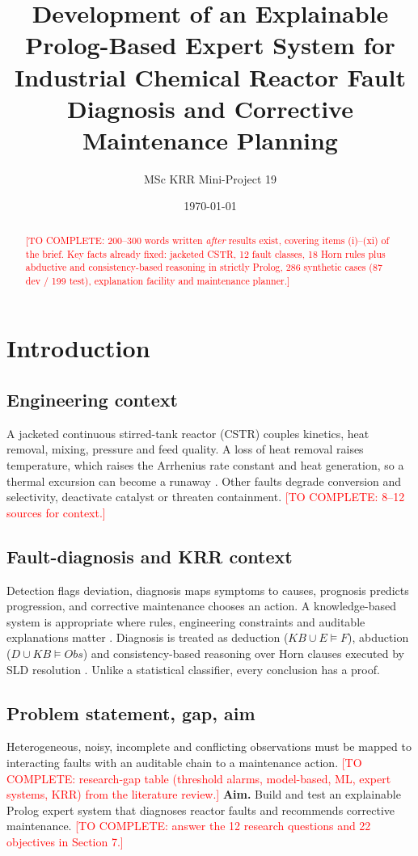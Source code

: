 \documentclass[11pt,a4paper]{article}
\title{Development of an Explainable Prolog-Based Expert System for Industrial Chemical Reactor Fault Diagnosis and Corrective Maintenance Planning}
\author{MSc KRR Mini-Project 19}
\date{\today}
\newcommand{\TODO}[1]{\textcolor{red}{[TO COMPLETE: #1]}}
\begin{document}
\maketitle
\begin{abstract}\TODO{200--300 words written \emph{after} results exist, covering items (i)--(xi) of the brief. Key facts already fixed: jacketed CSTR, 12 fault classes, 18 Horn rules plus abductive and consistency-based reasoning in strictly Prolog, 286 synthetic cases (87 dev / 199 test), explanation facility and maintenance planner.}\end{abstract}
\tableofcontents

\section{Introduction}
\subsection{Engineering context}
A jacketed continuous stirred-tank reactor (CSTR) couples kinetics, heat removal, mixing, pressure and feed quality. A loss of heat removal raises temperature, which raises the Arrhenius rate constant and heat generation, so a thermal excursion can become a runaway \cite{stoessel2008,fogler2016}. Other faults degrade conversion and selectivity, deactivate catalyst or threaten containment. \TODO{8--12 sources for context.}
\subsection{Fault-diagnosis and KRR context}
Detection flags deviation, diagnosis maps symptoms to causes, prognosis predicts progression, and corrective maintenance chooses an action. A knowledge-based system is appropriate where rules, engineering constraints and auditable explanations matter \cite{venkatasubramanian2003}. Diagnosis is treated as deduction ($KB\cup E\models F$), abduction ($D\cup KB\models Obs$) and consistency-based reasoning \cite{reiter1987,dekleer1987} over Horn clauses executed by SLD resolution \cite{lloyd1987,kowalski1974,sterling1994}. Unlike a statistical classifier, every conclusion has a proof.
\subsection{Problem statement, gap, aim}
Heterogeneous, noisy, incomplete and conflicting observations must be mapped to interacting faults with an auditable chain to a maintenance action. \TODO{research-gap table (threshold alarms, model-based, ML, expert systems, KRR) from the literature review.}
\textbf{Aim.} Build and test an explainable Prolog expert system that diagnoses reactor faults and recommends corrective maintenance. \TODO{answer the 12 research questions and 22 objectives in Section 7.}
\end{document}
